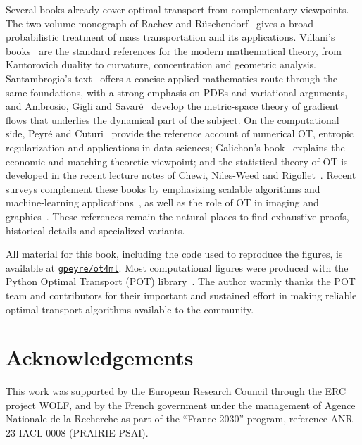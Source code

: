 \documentclass[10pt,a4paper,twoside,openany]{book}
\begin{document}
Several books already cover optimal transport from complementary viewpoints. The two-volume monograph of Rachev and R\"uschendorf~\cite{rachev1998mass,rachev1998mass2} gives a broad probabilistic treatment of mass transportation and its applications. Villani's books~\cite{Villani03,Villani09} are the standard references for the modern mathematical theory, from Kantorovich duality to curvature, concentration and geometric analysis. Santambrogio's text~\cite{SantambrogioBook} offers a concise applied-mathematics route through the same foundations, with a strong emphasis on PDEs and variational arguments, and Ambrosio, Gigli and Savar\'e~\cite{ambrosio2006gradient} develop the metric-space theory of gradient flows that underlies the dynamical part of the subject. On the computational side, Peyr\'e and Cuturi~\cite{peyre2019computational} provide the reference account of numerical OT, entropic regularization and applications in data sciences; Galichon's book~\cite{galichon2016optimal} explains the economic and matching-theoretic viewpoint; and the statistical theory of OT is developed in the recent lecture notes of Chewi, Niles-Weed and Rigollet~\cite{weed2025statistical}. Recent surveys complement these books by emphasizing scalable algorithms and machine-learning applications~\cite{khamis2024scalable,montesuma2023recent}, as well as the role of OT in imaging and graphics~\cite{bonneel2023survey}. These references remain the natural places to find exhaustive proofs, historical details and specialized variants.

All material for this book, including the code used to reproduce the figures, is available at \href{http://github.com/gpeyre/ot4ml}{\texttt{gpeyre/ot4ml}}. Most computational figures were produced with the Python Optimal Transport (POT) library~\cite{flamary2021pot}. The author warmly thanks the POT team and contributors for their important and sustained effort in making reliable optimal-transport algorithms available to the community.

\chapter*{Acknowledgements}

This work was supported by the European Research Council through the ERC project WOLF, and by the French government under the management of Agence Nationale de la Recherche as part of the ``France 2030'' program, reference ANR-23-IACL-0008 (PRAIRIE-PSAI).
\end{document}
